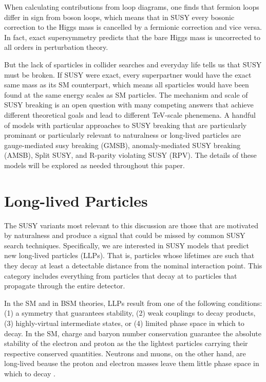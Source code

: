 \documentclass[12pt]{article}
\begin{document}
    When calculating contributions from loop diagrams, one finds that fermion loops differ in sign from boson loops, which means that in SUSY every bosonic correction to the Higgs mass is cancelled by a fermionic correction and vice versa. In fact, exact supersymmetry predicts that the bare Higgs mass is uncorrected to all orders in perturbation theory. 

    But the lack of sparticles in collider searches and everyday life tells us that SUSY must be broken. If SUSY were exact, every superpartner would have the exact same mass as its SM counterpart, which means all sparticles would have been found at the same energy scales as SM particles. The mechanism and scale of SUSY breaking is an open question with many competing answers that achieve different theoretical goals and lead to different TeV-scale phenemena. A handful of models with particular approaches to SUSY breaking that are particularly prominant or particularly relevant to naturalness or long-lived particles are gauge-mediated susy breaking (GMSB), anomaly-mediated SUSY breaking (AMSB), Split SUSY, and R-parity violating SUSY (RPV). The details of these models will be explored as needed throughout this paper.

\section{Long-lived Particles}
    The SUSY variants most relevant to this discussion are those that are motivated by naturalness and  produce a signal that could be missed by common SUSY search techniques. Specifically, we are interested in SUSY models that predict new long-lived particles (LLPs).  That is, particles whose lifetimes are such that they decay at least a detectable distance from the nominal interaction point. This category includes everything from particles that decay at  to particles that propagate through the entire detector. 

    In the SM and in BSM theories, LLPs result from one of the following conditions: (1) a symmetry that guarantees stability, (2) weak couplings to decay products, (3) highly-virtual intermediate states, or (4) limited phase space in which to decay. In the SM, charge and baryon number conservation guarantee the absolute stability of the electron and proton as the the lightest particles carrying their respective conserved quantities. Neutrons and muons, on the other hand, are long-lived beause the proton and electron masses leave them little phase space in which to decay . 
\end{document}
